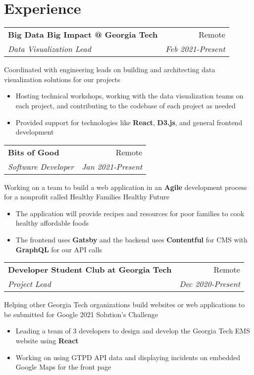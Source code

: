 \documentclass[letterpaper,8pt]{article}
\makeatletter
\newcommand{\resumeSubheading}[4]{
  \vspace{0.25em}
  \begin{tabular*}{1\textwidth}[t]{l@{\extracolsep{\fill}}r}
    \textbf{#1} & #2 \\
    \textit{#3} & \textit{#4} \\
  \end{tabular*}\vspace{-5pt}
}
\makeatother
\begin{document}
\vspace{5pt}
\section{Experience}

\resumeSubheading{Big Data Big Impact @ Georgia Tech}{Remote}{Data Visualization Lead}{Feb 2021-Present}

Coordinated with engineering leads on building and architecting data visualization solutions for our projects

\begin{itemize}[label=\raisebox{0.25ex}{\tiny$\bullet$}]
    \item Hosting technical workshops, working with the data visualization teams on each project, and contributing to the codebase of each project as needed
    \item Provided support for technologies like \textbf{React}, \textbf{D3.js}, and general frontend development
\end{itemize}
\vspace{5pt}

\resumeSubheading{Bits of Good}{Remote}{Software Developer}{Jan 2021-Present}

Working on a team to build a web application in an \textbf{Agile} development process for a nonprofit called Healthy Families Healthy Future

\begin{itemize}[label=\raisebox{0.25ex}{\tiny$\bullet$}]
    \item The application will provide recipes and resources for poor families to cook healthy affordable foods
    \item The frontend uses \textbf{Gatsby} and the backend uses \textbf{Contentful} for CMS with \textbf{GraphQL} for our API calls
\end{itemize}
\vspace{5pt}

\resumeSubheading{Developer Student Club at Georgia Tech}{Remote}{Project Lead}{Dec 2020-Present}

Helping other Georgia Tech organizations build websites or web applications to be submitted for Google 2021 Solution's Challenge

\begin{itemize}[label=\raisebox{0.25ex}{\tiny$\bullet$}]
    \item Leading a team of 3 developers to design and develop the Georgia Tech EMS website using \textbf{React}
    \item Working on using GTPD API data and displaying incidents on embedded Google Maps for the front page
\end{itemize}
\vspace{5pt}
\end{document}
